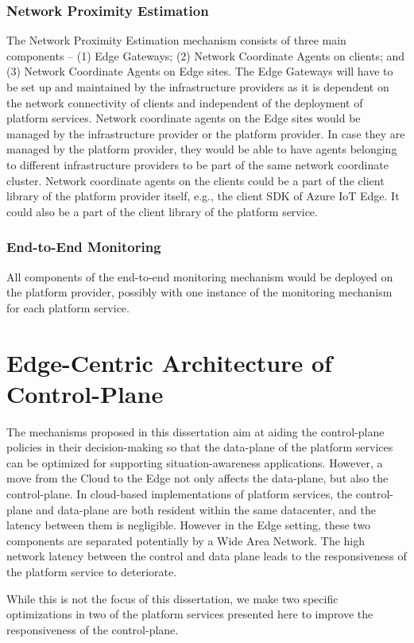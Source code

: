 \subsubsection{Network Proximity Estimation}
The Network Proximity Estimation mechanism consists of three main components -- (1) Edge Gateways; (2) Network Coordinate Agents on clients; and (3) Network Coordinate Agents on Edge sites. The Edge Gateways will have to be set up and maintained by the infrastructure providers as it is dependent on the network connectivity of clients and independent of the deployment of platform services. Network coordinate agents on the Edge sites would be managed by the infrastructure provider or the platform provider. In case they are managed by the platform provider, they would be able to have agents belonging to different infrastructure providers to be part of the same network coordinate cluster. Network coordinate agents on the clients could be a part of the client library of the platform provider itself, e.g., the client SDK of Azure IoT Edge. It could also be a part of the client library of the platform service.

\subsubsection{End-to-End Monitoring}
All components of the end-to-end monitoring mechanism would be deployed on the platform provider, possibly with one instance of the monitoring mechanism for each platform service.


\section{Edge-Centric Architecture of Control-Plane}

The mechanisms proposed in this dissertation aim at aiding the control-plane policies in their decision-making so that the data-plane of the platform services can be optimized for supporting situation-awareness applications. However, a move from the Cloud to the Edge not only affects the data-plane, but also the control-plane. In cloud-based implementations of platform services, the control-plane and data-plane are both resident within the same datacenter, and the latency between them is negligible. However in the Edge setting, these two components are separated potentially by a Wide Area Network. The high network latency between the control and data plane leads to the responsiveness of the platform service to deteriorate.
\par While this is not the focus of this dissertation, we make two specific optimizations in two of the platform services presented here to improve the responsiveness of the control-plane. 

